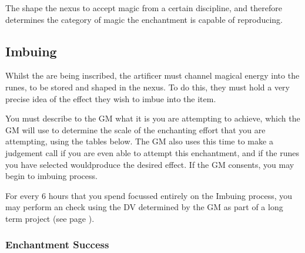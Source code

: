 {
	The  shape the nexus to accept magic from a certain discipline, and therefore determines the category of magic the enchantment is capable of reproducing.
}
{
	
	
	
	
	
	
	
	
	
	
	
	
	
} 





\subsection{Imbuing}

Whilst the  are being inscribed, the artificer must channel magical energy into the runes, to be stored and shaped in the nexus. To do this, they must hold a very precise idea of the effect they wish to imbue into the item. 

You must describe to the GM what it is you are attempting to achieve, which the GM will use to determine the scale of the enchanting effort that you are attempting, using the tables below. The GM also uses this time to make a judgement call if you are even able to attempt this enchantment, and if the runes you have selected wouldproduce the desired effect. If the GM consents, you may begin to imbuing process. 

For every 6 hours that you spend focussed entirely on the Imbuing process, you may perform an  check using the DV determined by the GM as part of a long term project (see page \pageref{S:Extended}). 


\subsubsection{Enchantment Success}

